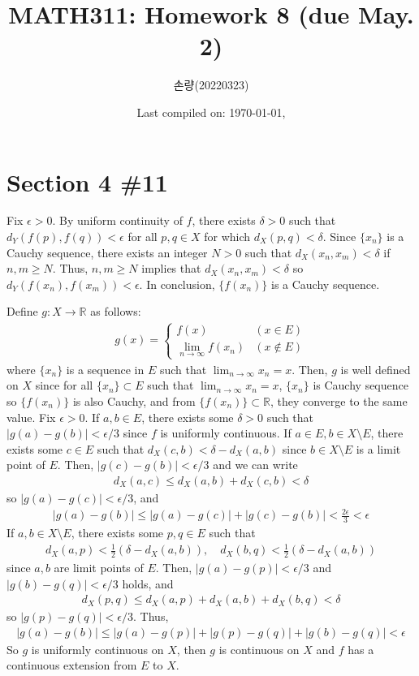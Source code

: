 \documentclass{scrartcl}
\title{MATH311: Homework 8 (due May. 2)}
\author{손량(20220323)}
\date{Last compiled on: \today, \currenttime}
\begin{document}
\maketitle

\section{Section 4 \#11}
Fix \(\epsilon > 0\).
By uniform continuity of \(f\), there exists \(\delta > 0\) such that \(d_Y(f(p), f(q)) < \epsilon\) for all \(p, q \in X\) for which \(d_X(p, q) < \delta\).
Since \(\{x_n\}\) is a Cauchy sequence, there exists an integer \(N > 0\) such that \(d_X(x_n, x_m) < \delta\) if \(n, m \geq N\).
Thus, \(n, m \geq N\) implies that \(d_X(x_n, x_m) < \delta\) so \(d_Y(f(x_n), f(x_m)) < \epsilon\).
In conclusion, \(\{f(x_n)\}\) is a Cauchy sequence.

Define \(g : X \to \mathbb{R}\) as follows:
\begin{align*}
  g(x) = \begin{cases}
    f(x) & (x \in E) \\
    \lim_{n \to \infty} f(x_n) & (x \not \in E)
  \end{cases}
\end{align*}
where \(\{x_n\}\) is a sequence in \(E\) such that \(\lim_{n \to \infty} x_n = x\).
Then, \(g\) is well defined on \(X\) since for all \(\{x_n\} \subset E\) such that \(\lim_{n \to \infty} x_n = x\), \(\{x_n\}\) is Cauchy sequence so \(\{f(x_n)\}\) is also Cauchy, and from \(\{f(x_n)\} \subset \mathbb{R}\), they converge to the same value.
Fix \(\epsilon > 0\).
If \(a, b \in E\), there exists some \(\delta > 0\) such that \(|g(a) - g(b)| < \epsilon / 3\) since \(f\) is uniformly continuous.
If \(a \in E, b \in X \setminus E\), there exists some \(c \in E\) such that \(d_X(c, b) < \delta - d_X(a, b)\) since \(b \in X \setminus E\) is a limit point of \(E\).
Then, \(|g(c) - g(b)| < \epsilon / 3\) and we can write
\begin{align*}
  d_X(a, c) \leq d_X(a, b) + d_X(c, b) < \delta
\end{align*}
so \(|g(a) - g(c)| < \epsilon / 3\), and
\begin{align*}
  |g(a) - g(b)| \leq |g(a) - g(c)| + |g(c) - g(b)| < \frac{2\epsilon}{3} < \epsilon
\end{align*}
If \(a, b \in X \setminus E\), there exists some \(p, q \in E\) such that
\begin{align*}
  d_X(a, p) < \frac{1}{2}(\delta - d_X(a, b)), \quad d_X(b, q) < \frac{1}{2}(\delta - d_X(a, b))
\end{align*}
since \(a, b\) are limit points of \(E\).
Then, \(|g(a) - g(p)| < \epsilon / 3\) and \(|g(b) - g(q)| < \epsilon / 3\) holds, and
\begin{align*}
  d_X(p, q) \leq d_X(a, p) + d_X(a, b) + d_X(b, q) < \delta
\end{align*}
so \(|g(p) - g(q)| < \epsilon / 3\).
Thus,
\begin{align*}
  |g(a) - g(b)| \leq |g(a) - g(p)| + |g(p) - g(q)| + |g(b) - g(q)| < \epsilon
\end{align*}
So \(g\) is uniformly continuous on \(X\), then \(g\) is continuous on \(X\) and \(f\) has a continuous extension from \(E\) to \(X\).
\end{document}
